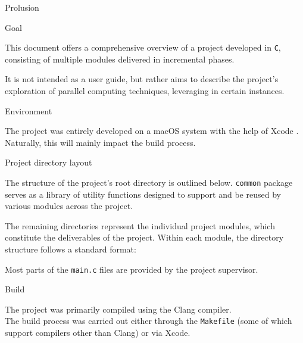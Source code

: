 \begin{chapter}{Prolusion}
	\begin{section}{Goal}
		\par This document offers a comprehensive overview of a project developed in \texttt{C}, consisting of multiple modules delivered in incremental phases.
		\par It is not intended as a user guide, but rather aims to describe the project’s exploration of parallel computing techniques, leveraging  in certain instances.
	\end{section}
	\begin{section}{Environment}
		\par The project was entirely developed on a macOS system with the help of Xcode .\\
		Naturally, this will mainly impact the build process.
	\end{section}
	\clearpage
	\begin{section}{Project directory layout}
		\par The structure of the project’s root directory is outlined below.
		\medskip
		\medskip
		\texttt{common} package serves as a library of utility functions designed to support and be reused by various modules across the project.
		\vspace{\baselineskip}
		\par The remaining directories represent the individual project modules, which constitute the deliverables of the project. Within each module, the directory structure follows a standard format:
		\medskip
		\medskip
		\par Most parts of the \texttt{main.c} files are provided by the project supervisor.
	\end{section}
	\clearpage
	\begin{section}{Build}
		\par The project was primarily compiled using the Clang compiler.\\
		The build process was carried out either through the \texttt{Makefile} (some of which support compilers other than Clang) or via Xcode.

\end{section}
\end{chapter}
